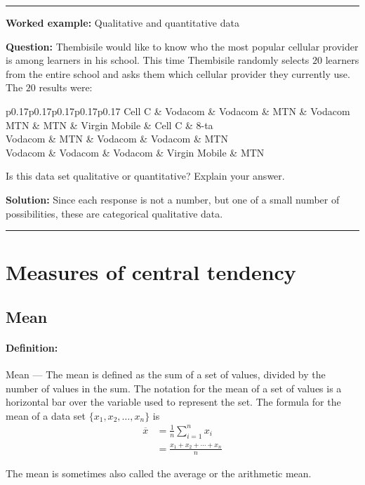 \documentclass[a4paper,11pt]{report}
\def\Definition#1#2{\paragraph{Definition:} #1 --- #2}
\newenvironment{wex}[3]%
{\rule{\linewidth}{0.5mm}
\textbf{Worked example:} #1

\textbf{Question:} #2

\textbf{Solution:} #3}%
{\rule{\linewidth}{0.5mm}}
\begin{document}
\begin{wex}{Qualitative and quantitative data}{
    Thembisile would like to know who the most popular cellular
    provider is among learners in his school. This time Thembisile
    randomly selects $20$ learners from the entire school and asks them
    which cellular provider they currently use. The $20$ results were:

    \begin{center}
      \begin{tabular}{p{0.17\textwidth}p{0.17\textwidth}p{0.17\textwidth}p{0.17\textwidth}p{0.17\textwidth}}
        \toprule
        Cell C & Vodacom & Vodacom & MTN & Vodacom \\
        MTN & MTN & Virgin Mobile & Cell C & 8-ta \\
        Vodacom & MTN & Vodacom & Vodacom & MTN \\
        Vodacom & Vodacom & Vodacom & Virgin Mobile & MTN \\
        \bottomrule
      \end{tabular}
    \end{center}

    Is this data set qualitative or quantitative? Explain your answer.
}{
  Since each response is not a number, but one of a small number of
  possibilities, these are categorical qualitative data.

}
\end{wex}

\section{Measures of central tendency}

\subsection{Mean}
\Definition{Mean}{The mean is defined as the sum of a set of values,
  divided by the number of values in the sum.  The notation for the
  mean of a set of values is a horizontal bar over the variable used
  to represent the set. The formula for the mean of a data set $\{x_1,
  x_2, \ldots, x_n\}$ is
  \begin{align}
    \overline{x} &= \frac{1}{n}\sum_{i=1}^n x_i \\
                 &= \frac{x_1 + x_2 + \cdots + x_n}{n}
  \end{align}
}

The mean is sometimes also called the average or the arithmetic mean.
\end{document}
